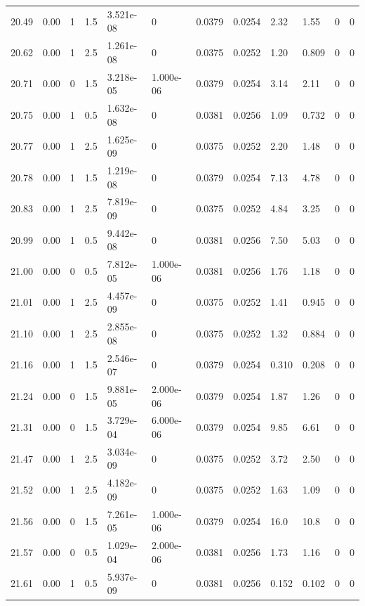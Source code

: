 \documentclass[preview]{standalone}
\begin{document}
{{{{{{{\begin{tabular}{L{1.2cm}C{1.2cm} C{0.3cm}C{0.5cm} C{1.4cm}C{1.4cm} C{1.4cm}C{1.4cm} C{1.6cm}C{1.6cm} C{1.6cm}C{1.6cm}}
  20.49  &  0.00  & 1     & 1.5 &  3.521e-08  & 0  &  0.0379&   0.0254& 2.32 & 1.55   &  0 & 0  \\ 
  20.62  &  0.00  & 1     & 2.5 &  1.261e-08  & 0  &  0.0375&   0.0252& 1.20 & 0.809   &  0 & 0  \\ 
  20.71  &  0.00  & 0     & 1.5 &  3.218e-05  & 1.000e-06  &  0.0379&   0.0254& 3.14 & 2.11   &  0 & 0  \\ 
  20.75  &  0.00  & 1     & 0.5 &  1.632e-08  & 0  &  0.0381&   0.0256& 1.09 & 0.732   &  0 & 0  \\ 
  20.77  &  0.00  & 1     & 2.5 &  1.625e-09  & 0  &  0.0375&   0.0252& 2.20 & 1.48   &  0 & 0  \\ 
  20.78  &  0.00  & 1     & 1.5 &  1.219e-08  & 0  &  0.0379&   0.0254& 7.13 & 4.78   &  0 & 0  \\ 
  20.83  &  0.00  & 1     & 2.5 &  7.819e-09  & 0  &  0.0375&   0.0252& 4.84 & 3.25   &  0 & 0  \\ 
  20.99  &  0.00  & 1     & 0.5 &  9.442e-08  & 0  &  0.0381&   0.0256& 7.50 & 5.03   &  0 & 0  \\ 
  21.00  &  0.00  & 0     & 0.5 &  7.812e-05  & 1.000e-06  &  0.0381&   0.0256& 1.76 & 1.18   &  0 & 0  \\ 
  21.01  &  0.00  & 1     & 2.5 &  4.457e-09  & 0  &  0.0375&   0.0252& 1.41 & 0.945   &  0 & 0  \\ 
  21.10  &  0.00  & 1     & 2.5 &  2.855e-08  & 0  &  0.0375&   0.0252& 1.32 & 0.884   &  0 & 0  \\ 
  21.16  &  0.00  & 1     & 1.5 &  2.546e-07  & 0  &  0.0379&   0.0254& 0.310 & 0.208   &  0 & 0  \\ 
  21.24  &  0.00  & 0     & 1.5 &  9.881e-05  & 2.000e-06  &  0.0379&   0.0254& 1.87 & 1.26   &  0 & 0  \\ 
  21.31  &  0.00  & 0     & 1.5 &  3.729e-04  & 6.000e-06  &  0.0379&   0.0254& 9.85 & 6.61   &  0 & 0  \\ 
  21.47  &  0.00  & 1     & 2.5 &  3.034e-09  & 0  &  0.0375&   0.0252& 3.72 & 2.50   &  0 & 0  \\ 
  21.52  &  0.00  & 1     & 2.5 &  4.182e-09  & 0  &  0.0375&   0.0252& 1.63 & 1.09   &  0 & 0  \\ 
  21.56  &  0.00  & 0     & 1.5 &  7.261e-05  & 1.000e-06  &  0.0379&   0.0254& 16.0 & 10.8   &  0 & 0  \\ 
  21.57  &  0.00  & 0     & 0.5 &  1.029e-04  & 2.000e-06  &  0.0381&   0.0256& 1.73 & 1.16   &  0 & 0  \\ 
  21.61  &  0.00  & 1     & 0.5 &  5.937e-09  & 0  &  0.0381&   0.0256& 0.152 & 0.102   &  0 & 0  \\ 

\end{tabular}}}}}}}}
\end{document}
